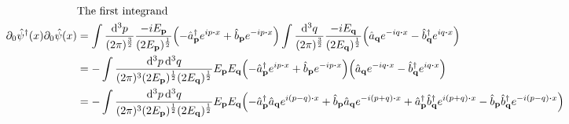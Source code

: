 \documentclass{article}
\begin{document}
\begin{align*}
                                                              & \qq*{The first integrand}                                                                                                                                                                                                                                                                                                                                             \\
    \partial_0 \hat{\psi}^\dagger (x)\partial_0 \hat{\psi}(x) & =\int \frac{\dd[3]{p}}{(2\pi)^\frac{3}{2}}  \frac{-iE_{\vb{p}}}{(2E_{\vb{p}})^{\frac{1}{2}}}\pqty{-\hat{a}^\dagger_{\vb{p}}e^{ip\vdot x}+\hat{b}_{\vb{p}}e^{-ip\vdot x}}\int \frac{\dd[3]{q}}{(2\pi)^\frac{3}{2}}  \frac{-iE_{\vb{q}}}{(2E_{\vb{q}})^{\frac{1}{2}}}  \pqty{\hat{a}_{\vb{q}}e^{-iq\vdot x}-\hat{b}^\dagger_{\vb{q}}e^{iq\vdot x}}                      \\
                                                              & =-\int \frac{\dd[3]{p}\dd[3]{q}}{(2\pi)^3(2E_{\vb{p}})^{\frac{1}{2}}(2E_{\vb{q}})^{\frac{1}{2}}}E_{\vb{p}}E_{\vb{q}}\pqty{-\hat{a}^\dagger_{\vb{p}}e^{ip\vdot x}+\hat{b}_{\vb{p}}e^{-ip\vdot x}}\pqty{\hat{a}_{\vb{q}}e^{-iq\vdot x}-\hat{b}^\dagger_{\vb{q}}e^{iq\vdot x}}                                                                                           \\
                                                              & =-\int \frac{\dd[3]{p}\dd[3]{q}}{(2\pi)^3(2E_{\vb{p}})^{\frac{1}{2}}(2E_{\vb{q}})^{\frac{1}{2}}}E_{\vb{p}}E_{\vb{q}}\pqty{-\hat{a}^\dagger_{\vb{p}}\hat{a}_{\vb{q}}e^{i(p-q)\vdot x}+\hat{b}_{\vb{p}}\hat{a}_{\vb{q}}e^{-i(p+q)\vdot x}+\hat{a}^\dagger_{\vb{p}}\hat{b}^\dagger_{\vb{q}}e^{i(p+q)\vdot x}-\hat{b}_{\vb{p}}\hat{b}^\dagger_{\vb{q}}e^{-i(p-q)\vdot x}}
\end{align*}
\end{document}
